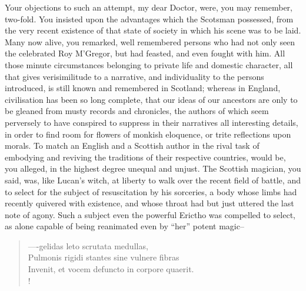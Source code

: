 Your objections to such an attempt, my dear Doctor, were, you may
remember, two-fold. You insisted upon the advantages which the Scotsman
possessed, from the very recent existence of that state of society in
which his scene was to be laid. Many now alive, you remarked, well
remembered persons who had not only seen the celebrated Roy M'Gregor,
but had feasted, and even fought with him. All those minute
circumstances belonging to private life and domestic character, all that
gives verisimilitude to a narrative, and individuality to the persons
introduced, is still known and remembered in Scotland; whereas in
England, civilisation has been so long complete, that our ideas of our
ancestors are only to be gleaned from musty records and chronicles, the
authors of which seem perversely to have conspired to suppress in their
narratives all interesting details, in order to find room for flowers of
monkish eloquence, or trite reflections upon morals. To match an English
and a Scottish author in the rival task of embodying and reviving the
traditions of their respective countries, would be, you alleged, in the
highest degree unequal and unjust. The Scottish magician, you said, was,
like Lucan's witch, at liberty to walk over the recent field of battle,
and to select for the subject of resuscitation by his sorceries, a body
whose limbs had recently quivered with existence, and whose throat had
but just uttered the last note of agony. Such a subject even the
powerful Erictho was compelled to select, as alone capable of being
reanimated even by ``her'' potent magic--

\begin{verse}
----gelidas leto scrutata medullas,\\
Pulmonis rigidi stantes sine vulnere fibras\\
Invenit, et vocem defuncto in corpore quaerit.\\!
\end{verse}

